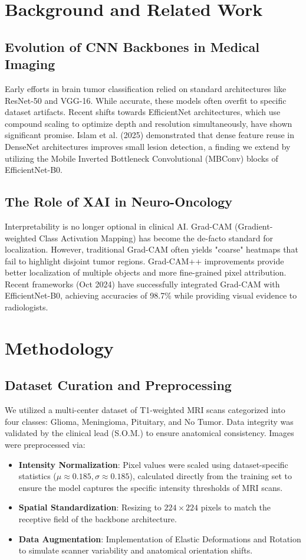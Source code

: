 \documentclass[a4paper,11pt]{article}
\begin{document}
\section{Background and Related Work}

\subsection{Evolution of CNN Backbones in Medical Imaging}
Early efforts in brain tumor classification relied on standard architectures like ResNet-50 and VGG-16. While accurate, these models often overfit to specific dataset artifacts. Recent shifts towards EfficientNet architectures, which use compound scaling to optimize depth and resolution simultaneously, have shown significant promise. Islam et al. (2025) demonstrated that dense feature reuse in DenseNet architectures improves small lesion detection, a finding we extend by utilizing the Mobile Inverted Bottleneck Convolutional (MBConv) blocks of EfficientNet-B0.

\subsection{The Role of XAI in Neuro-Oncology}
Interpretability is no longer optional in clinical AI. Grad-CAM (Gradient-weighted Class Activation Mapping) has become the de-facto standard for localization. However, traditional Grad-CAM often yields "coarse" heatmaps that fail to highlight disjoint tumor regions. Grad-CAM++ improvements provide better localization of multiple objects and more fine-grained pixel attribution. Recent frameworks (Oct 2024) have successfully integrated Grad-CAM with EfficientNet-B0, achieving accuracies of 98.7\% while providing visual evidence to radiologists.

\section{Methodology}

\subsection{Dataset Curation and Preprocessing}
We utilized a multi-center dataset of T1-weighted MRI scans categorized into four classes: Glioma, Meningioma, Pituitary, and No Tumor. Data integrity was validated by the clinical lead (S.O.M.) to ensure anatomical consistency. Images were preprocessed via:
\begin{itemize}
    \item \textbf{Intensity Normalization}: Pixel values were scaled using dataset-specific statistics ($\mu \approx 0.185, \sigma \approx 0.185$), calculated directly from the training set to ensure the model captures the specific intensity thresholds of MRI scans.
    \item \textbf{Spatial Standardization}: Resizing to $224 \times 224$ pixels to match the receptive field of the backbone architecture.
    \item \textbf{Data Augmentation}: Implementation of Elastic Deformations and Rotation to simulate scanner variability and anatomical orientation shifts.
\end{itemize}
\end{document}
